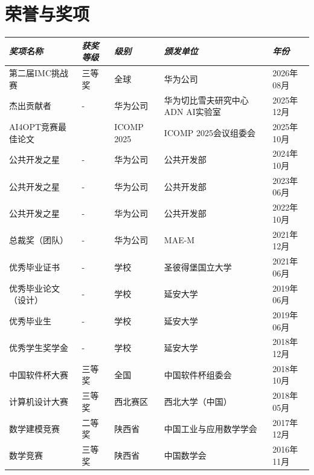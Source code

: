 \documentclass[letterpaper,10pt,fontset=none]{ctexart}
\makeatletter
\newcommand{\awardsTable}[1]{
	\begin{tabularx}{\textwidth}{l @{\extracolsep{\fill}} *{4}{l}}
	\emph{奖项名称}	& \emph{获奖等级}	& \emph{级别}	& \emph{颁发单位} & \emph{年份}       \\
	\midrule\midrule
	#1
	\end{tabularx}
}
\newcommand{\awardsTableRow}[6]{
	\BeginAccSupp{method=plain, ActualText=11\string\t 21}#1 & #2 & #3 & #4 & #5\EndAccSupp{} \\
}
\makeatother
\begin{document}
\section{荣誉与奖项}
\setlength{\tabcolsep}{6.0pt}
\renewcommand{\arraystretch}{1.1}
\fontsize{8.5}{11}\selectfont
\awardsTable{
  \awardsTableRow{第二届IMC挑战赛}{三等奖}{全球}{华为公司}{2026年08月} \\
  \awardsTableRow{杰出贡献者}{-}{华为公司}{华为切比雪夫研究中心 ADN AI实验室}{2025年12月} \\
  \awardsTableRow{AI4OPT竞赛最佳论文}{\nth{1}}{ICOMP 2025}{ICOMP 2025会议组委会}{2025年10月}
                  \\
  \awardsTableRow{公共开发之星}{-}{华为公司}{公共开发部}{2024年10月} \\
  \awardsTableRow{公共开发之星}{-}{华为公司}{公共开发部}{2023年06月} \\
  \awardsTableRow{公共开发之星}{-}{华为公司}{公共开发部}{2022年10月} \\
  \awardsTableRow{总裁奖（团队）}{-}{华为公司}{MAE-M}{2021年12月} \\
  \awardsTableRow{优秀毕业证书}{-}{学校}{圣彼得堡国立大学}{2021年06月} \\
  \awardsTableRow{优秀毕业论文（设计）}{-}{学校}{延安大学}{2019年06月} \\
  \awardsTableRow{优秀毕业生}{-}{学校}{延安大学}{2019年06月} \\
  \awardsTableRow{优秀学生奖学金}{-}{学校}{延安大学}{2018年12月} \\
  \awardsTableRow{中国软件杯大赛}{三等奖}{全国}{中国软件杯组委会}{2018年10月} \\
  \awardsTableRow{计算机设计大赛}{三等奖}{西北赛区}{西北大学（中国）}{2018年05月} \\
  \awardsTableRow{数学建模竞赛}{二等奖}{陕西省}{中国工业与应用数学学会}{2017年12月} \\
  \awardsTableRow{数学竞赛}{三等奖}{陕西省}{中国数学会}{2016年11月} \\ \hline }
\end{document}

